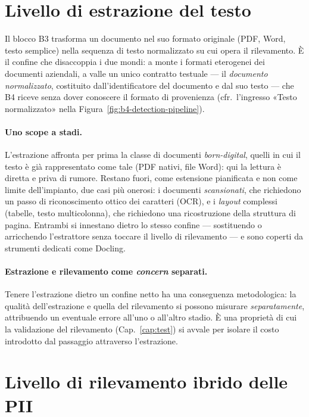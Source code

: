 \section{Livello di estrazione del testo}
\label{sec:estrazione-b3}

Il blocco B3 trasforma un documento nel suo formato originale (PDF, Word, testo semplice) nella sequenza di testo normalizzato su cui opera il rilevamento. È il confine che disaccoppia i due mondi: a monte i formati eterogenei dei documenti aziendali, a valle un unico contratto testuale --- il \emph{documento normalizzato}, costituito dall'identificatore del documento e dal suo testo --- che B4 riceve senza dover conoscere il formato di provenienza (cfr.\ l'ingresso «Testo normalizzato» nella Figura~\ref{fig:b4-detection-pipeline}).

\paragraph{Uno scope a stadi.} L'estrazione affronta per prima la classe di documenti \emph{born-digital}, quelli in cui il testo è già rappresentato come tale (PDF nativi, file Word): qui la lettura è diretta e priva di rumore. Restano fuori, come estensione pianificata e non come limite dell'impianto, due casi più onerosi: i documenti \emph{scansionati}, che richiedono un passo di riconoscimento ottico dei caratteri (OCR), e i \emph{layout} complessi (tabelle, testo multicolonna), che richiedono una ricostruzione della struttura di pagina. Entrambi si innestano dietro lo stesso confine --- sostituendo o arricchendo l'estrattore senza toccare il livello di rilevamento --- e sono coperti da strumenti dedicati come Docling.

\paragraph{Estrazione e rilevamento come \emph{concern} separati.} Tenere l'estrazione dietro un confine netto ha una conseguenza metodologica: la qualità dell'estrazione e quella del rilevamento si possono misurare \emph{separatamente}, attribuendo un eventuale errore all'uno o all'altro stadio. È una proprietà di cui la validazione del rilevamento (Cap.~\ref{cap:test}) si avvale per isolare il costo introdotto dal passaggio attraverso l'estrazione.

\section{Livello di rilevamento ibrido delle PII}
\label{sec:rilevamento-b4}

